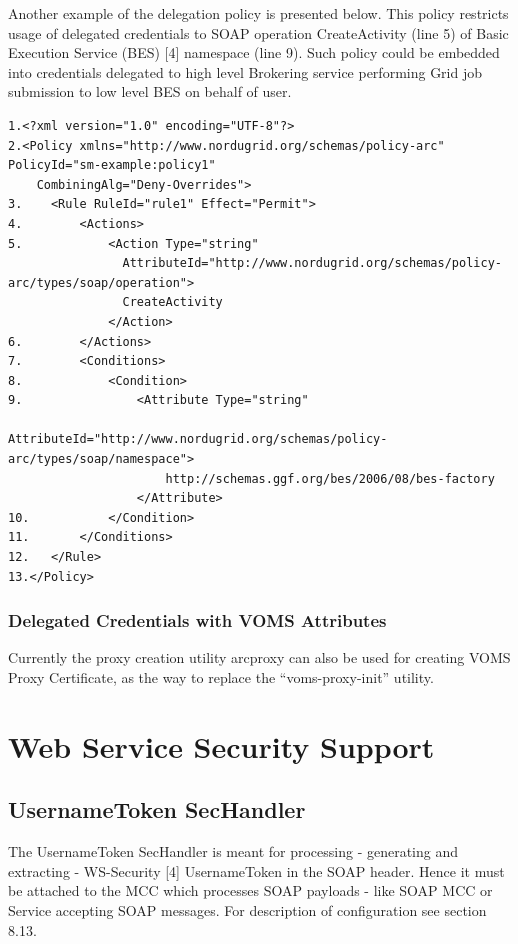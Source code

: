 \documentclass{article}                            %
\begin{document}
Another example of the delegation policy is presented below. This policy restricts usage of delegated credentials to SOAP operation CreateActivity (line 5) of Basic Execution Service (BES) [4] namespace (line 9). Such policy could be embedded into credentials delegated to high level Brokering service performing Grid job submission to low level BES on behalf of user.

\begin{verbatim}
1.<?xml version="1.0" encoding="UTF-8"?>
2.<Policy xmlns="http://www.nordugrid.org/schemas/policy-arc" PolicyId="sm-example:policy1" 
    CombiningAlg="Deny-Overrides">
3.    <Rule RuleId="rule1" Effect="Permit">
4.        <Actions>
5.            <Action Type="string" 
                AttributeId="http://www.nordugrid.org/schemas/policy-arc/types/soap/operation">
                CreateActivity
              </Action>
6.        </Actions>
7.        <Conditions>
8.            <Condition>
9.                <Attribute Type="string" 
                      AttributeId="http://www.nordugrid.org/schemas/policy-arc/types/soap/namespace">
                      http://schemas.ggf.org/bes/2006/08/bes-factory
                  </Attribute>
10.           </Condition>
11.       </Conditions>
12.   </Rule>
13.</Policy>
\end{verbatim}

\subsubsection{Delegated Credentials with VOMS Attributes} %
\label{subsec:delegation_voms}
Currently the proxy creation utility arcproxy can also be used for creating VOMS Proxy Certificate, as the way to replace the ``voms-proxy-init'' utility.






\section{Web Service Security Support} %
\label{sec:webservice}

\subsection{UsernameToken SecHandler} %
\label{subsec:username_token}
The UsernameToken SecHandler is meant for processing - generating and extracting - WS-Security [4] UsernameToken in the SOAP header. Hence it must be attached to the MCC which processes SOAP payloads - like SOAP MCC or Service accepting SOAP messages. For description of configuration see section 8.13.
\end{document}
